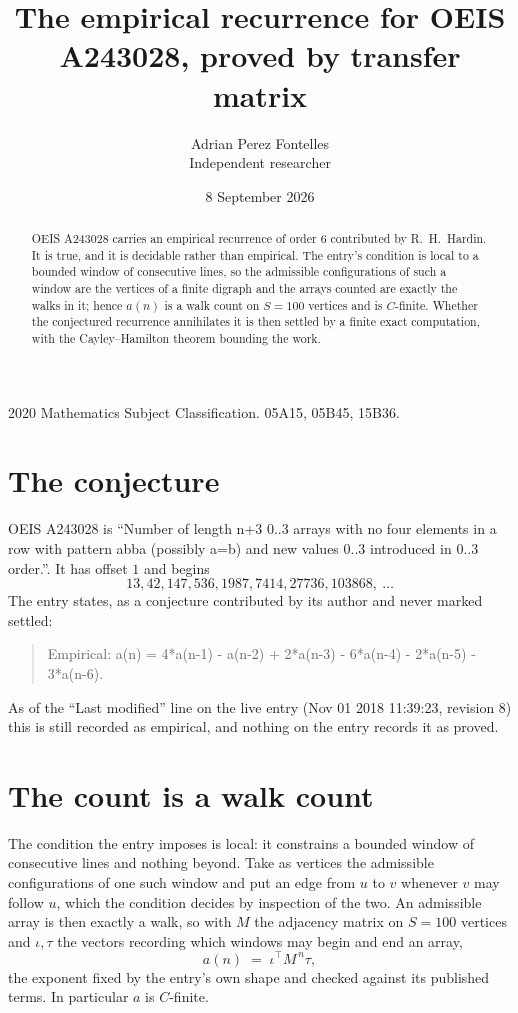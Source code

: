\documentclass[11pt,a4paper]{article}
\title{The empirical recurrence for OEIS A243028, proved by transfer matrix}
\author{Adrian Perez Fontelles\\ \small Independent researcher}
\date{8 September 2026}
\theoremstyle{plain}
\theoremstyle{definition}
\begin{document}
\maketitle

\begin{abstract}
OEIS A243028 carries an empirical recurrence of order $6$ contributed by R.~H.~Hardin. It is
true, and it is decidable rather than empirical. The entry's condition is local to a bounded window of consecutive lines, so
the admissible configurations of such a window are the vertices of a finite digraph and the
arrays counted are exactly the walks in it; hence $a(n)$ is a walk count on $S=100$ vertices
and is $C$-finite. Whether the conjectured recurrence annihilates it is then settled by a
finite exact computation, with the Cayley--Hamilton theorem bounding the work.
\end{abstract}

\noindent\small 2020 Mathematics Subject Classification. 05A15, 05B45, 15B36.\normalsize

\section{The conjecture}

OEIS A243028 is ``Number of length n+3 0..3 arrays with no four elements in a row with pattern abba (possibly a=b) and new values 0..3 introduced in 0..3 order.''. It has offset $1$ and begins
\[
13, 42, 147, 536, 1987, 7414, 27736, 103868,\ \dots
\]
The entry states, as a conjecture contributed by its author and never marked settled:
\begin{quote}
Empirical: a(n) = 4*a(n-1) - a(n-2) + 2*a(n-3) - 6*a(n-4) - 2*a(n-5) - 3*a(n-6).
\end{quote}
As of the ``Last modified'' line on the live entry (Nov 01 2018 11:39:23, revision 8) this is still
recorded as empirical, and nothing on the entry records it as proved.

\section{The count is a walk count}

The condition the entry imposes is local: it constrains a bounded window of consecutive lines and nothing beyond. Take as
vertices the admissible configurations of one such window and put an edge from $u$ to $v$
whenever $v$ may follow $u$, which the condition decides by inspection of the two. An
admissible array is then exactly a walk, so with $M$ the adjacency matrix on $S=100$ vertices
and $\iota,\tau$ the vectors recording which windows may begin and end an array,
\[
a(n)\;=\;\iota^{\!\top}M^{\,n}\tau ,
\]
the exponent fixed by the entry's own shape and checked against its published terms. In
particular $a$ is $C$-finite.
\end{document}
